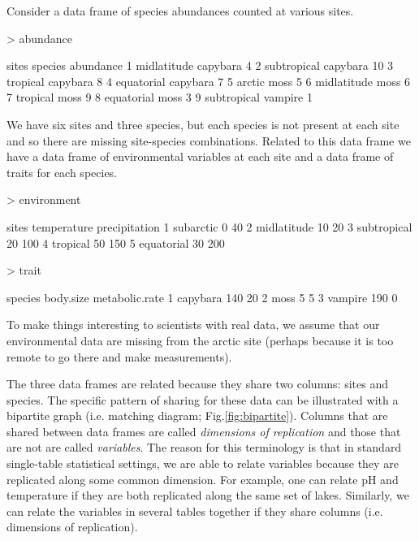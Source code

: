 \documentclass[a4paper]{report}
\numberwithin{exercise}{section}
\begin{document}
\begin{article}
Consider a data frame of species abundances counted at various sites.
\begin{Schunk}
\begin{Sinput}
> abundance
\end{Sinput}
\begin{Soutput}
        sites  species abundance
1 midlatitude capybara         4
2 subtropical capybara        10
3    tropical capybara         8
4  equatorial capybara         7
5      arctic     moss         5
6 midlatitude     moss         6
7    tropical     moss         9
8  equatorial     moss         3
9 subtropical  vampire         1
\end{Soutput}
\end{Schunk}
We have six sites and three species, but each species is not present at each site and so there are missing site-species combinations.  Related to this  data frame we have a data frame of environmental variables at each site and a data frame of traits for each species.
\begin{Schunk}
\begin{Sinput}
> environment
\end{Sinput}
\begin{Soutput}
        sites temperature precipitation
1   subarctic           0            40
2 midlatitude          10            20
3 subtropical          20           100
4    tropical          50           150
5  equatorial          30           200
\end{Soutput}
\begin{Sinput}
> trait
\end{Sinput}
\begin{Soutput}
   species body.size metabolic.rate
1 capybara       140             20
2     moss         5              5
3  vampire       190              0
\end{Soutput}
\end{Schunk}
To make things interesting to scientists with real data, we assume that our environmental data are missing from the arctic site (perhaps because it is too remote to go there and make measurements).

The three data frames are related because they share two columns:  sites and species.  The specific pattern of sharing for these data can be illustrated with a bipartite graph (i.e. matching diagram; Fig.\ref{fig:bipartite}).  Columns that are shared between data frames are called \emph{dimensions of replication} and those that are not are called \emph{variables}.  The reason for this terminology is that in standard single-table statistical settings, we are able to relate variables because they are replicated along some common dimension.  For example, one can relate pH and temperature if they are both replicated along the same set of lakes.  Similarly, we can relate the variables in several tables together if they share columns (i.e. dimensions of replication).


\end{article}
\end{document}

